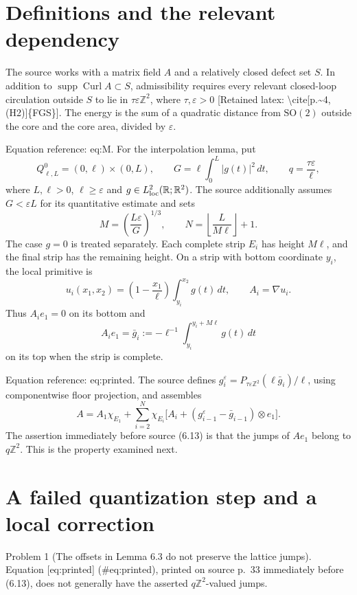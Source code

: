 \documentclass[10pt]{article}
\begin{document}
\section*{Definitions and the relevant dependency}
The source works with a matrix field \(A\) and a relatively closed defect set \(S\). In addition to \(\operatorname{supp}\operatorname{Curl}A\subset S\), admissibility requires every relevant closed-loop circulation outside \(S\) to lie in \(\tau\varepsilon\mathbb Z^2\), where \(\tau,\varepsilon>0\) [Retained latex: \textbackslash{}cite[p.\textasciitilde{}4, (H2)]\{FGS\}]. The energy is the sum of a quadratic distance from \(\mathrm{SO}(2)\) outside the core and the core area, divided by \(\varepsilon\).\par
Equation reference: eq:M. For the interpolation lemma, put \[Q_{\ell,L}^0=(0,\ell)\times(0,L),\qquad
 G=\ell\int_0^L |g(t)|^2\,dt,\qquad
 q=\frac{\tau\varepsilon}{\ell},\] where \(L,\ell>0\), \(\ell\ge\varepsilon\) and \(g\in L^2_{\rm loc}(\mathbb R;\mathbb R^2)\). The source additionally assumes \(G<\varepsilon L\) for its quantitative estimate and sets \[
 M=\left(\frac{L\varepsilon}{G}\right)^{1/3},\qquad
 N=\left\lfloor\frac{L}{M\ell}\right\rfloor+1.\] The case \(g=0\) is treated separately. Each complete strip \(E_i\) has height \(M\ell\), and the final strip has the remaining height. On a strip with bottom coordinate \(y_i\), the local primitive is \[u_i(x_1,x_2)=
 \left(1-\frac{x_1}{\ell}\right)\int_{y_i}^{x_2}g(t)\,dt,\qquad A_i=\nabla u_i.\] Thus \(A_i e_1=0\) on its bottom and \[A_i e_1=\bar g_i:=-\ell^{-1}
       \int_{y_i}^{y_i+M\ell}g(t)\,dt\] on its top when the strip is complete.\par
Equation reference: eq:printed. The source defines \(g_i^\varepsilon=P_{\tau\varepsilon\mathbb Z^2}(\ell\bar g_i)/\ell\), using componentwise floor projection, and assembles \[
 A=A_1\chi_{E_1}
   +\sum_{i=2}^{N}\chi_{E_i}
       \bigl[A_i+(g_{i-1}^{\varepsilon}-\bar g_{i-1})\otimes e_1\bigr].\] The assertion immediately before source (6.13) is that the jumps of \(Ae_1\) belong to \(q\mathbb Z^2\). This is the property examined next.\par
\section*{A failed quantization step and a local correction}
Problem 1 (The offsets in Lemma 6.3 do not preserve the lattice jumps).  Equation [eq:printed] (\#eq:printed), printed on source p. 33 immediately before (6.13), does not generally have the asserted \(q\mathbb Z^2\)-valued jumps.\par
\end{document}
